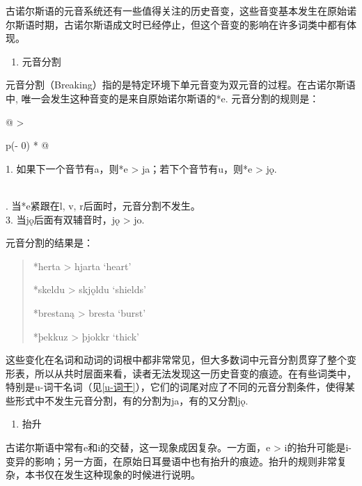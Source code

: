 古诺尔斯语的元音系统还有一些值得关注的历史音变，这些音变基本发生在原始诺尔斯语时期，古诺尔斯语成文时已经停止，但这个音变的影响在许多词类中都有体现。

\begin{enumerate}
  \def\labelenumi{\Alph{enumi}.}
  \setcounter{enumi}{3}
  \item
        元音分割
\end{enumerate}

元音分割（Breaking）指的是特定环境下单元音变为双元音的过程。在古诺尔斯语中,
唯一会发生这种音变的是来自原始诺尔斯语的*e. 元音分割的规则是：

\begin{longtable}[]{@{}
  >{\raggedright\arraybackslash}p{(\columnwidth - 0\tabcolsep) * }@{}}
  \toprule\noalign{}
  \begin{minipage}[b]{\linewidth}\raggedright
    1. 如果下一个音节有a，则*e \textgreater{} ja；若下个音节有u，则*e
    \textgreater{} jǫ.
  \end{minipage} \\
  \midrule\noalign{}
  \endhead
  \bottomrule\noalign{}
  . 当*e紧跟在l, v, r后面时，元音分割不发生。                     \\
  3. 当jǫ后面有双辅音时，jǫ \textgreater{} jo.                     \\
\end{longtable}

元音分割的结果是：

\begin{quote}
  *herta \textgreater{} hjarta `heart'

  *skeldu \textgreater{} skjǫldu `shields'

  *brestaną \textgreater{} bresta `burst'

  *þekkuz \textgreater{} þjokkr `thick'
\end{quote}

这些变化在名词和动词的词根中都非常常见，但大多数词中元音分割贯穿了整个变形表，所以从共时层面来看，读者无法发现这一历史音变的痕迹。在有些词类中，特别是u-词干名词（见\ref{u-词干}），它们的词尾对应了不同的元音分割条件，使得某些形式中不发生元音分割，有的分割为ja，有的又分割jǫ.

\begin{enumerate}
  \def\labelenumi{\Alph{enumi}.}
  \setcounter{enumi}{4}
  \item
        抬升
\end{enumerate}

古诺尔斯语中常有e和i的交替，这一现象成因复杂。一方面，e \textgreater{}
i的抬升可能是i-变异的影响；另一方面，在原始日耳曼语中也有抬升的痕迹。抬升的规则非常复杂，本书仅在发生这种现象的时候进行说明。

